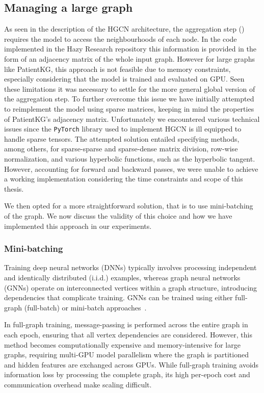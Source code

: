 \subsection{Managing a large graph}
As seen in the description of the HGCN architecture, the aggregation step () requires the model to access the neighbourhoods of each node. In the code implemented in the Hazy Research repository this information is provided in the form of an adjacency matrix of the whole input graph. However for large graphs like PatientKG, this approach is not feasible due to memory constraints, especially considering that the model is trained and evaluated on GPU.
Seen these limitations it was necessary to settle for the more general global version of the aggregation step. 
To further overcome this issue we have initially attempted to reimplement the model using sparse matrices, keeping in mind the properties of PatientKG's adjacency matrix. Unfortunately we encountered various technical issues since the \texttt{PyTorch} library used to implement HGCN is ill equipped to handle sparse tensors. The attempted solution entailed specifying methods, among others, for sparse-sparse and sparse-dense matrix division, row-wise normalization, and various hyperbolic functions, such as the hyperbolic tangent. However, accounting for forward and backward passes, we were unable to achieve a working implementation considering the time constraints and scope of this thesis.

We then opted for a more straightforward solution, that is to use mini-batching of the graph. We now discuss the validity of this choice and how we have implemented this approach in our experiments.

\subsubsection{Mini-batching}

Training deep neural networks (DNNs) typically involves processing independent and identically distributed (i.i.d.) examples, whereas graph neural networks (GNNs) operate on interconnected vertices within a graph structure, introducing dependencies that complicate training. GNNs can be trained using either full-graph (full-batch) or mini-batch approaches~\cite{bajaj2024graph}.

In full-graph training, message-passing is performed across the entire graph in each epoch, ensuring that all vertex dependencies are considered. However, this method becomes computationally expensive and memory-intensive for large graphs, requiring multi-GPU model parallelism where the graph is partitioned and hidden features are exchanged across GPUs. While full-graph training avoids information loss by processing the complete graph, its high per-epoch cost and communication overhead make scaling difficult.

